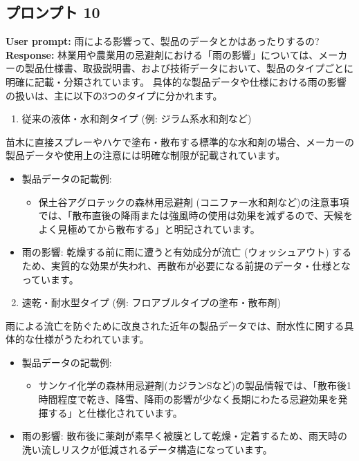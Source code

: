 \documentclass[a4paper, 11pt]{jsarticle}
\begin{document}
\subsection{プロンプト 10}
\noindent\textbf{User prompt:} 雨による影響って、製品のデータとかはあったりするの? \\
\noindent\textbf{Response:} 林業用や農業用の忌避剤における「雨の影響」については、メーカーの製品仕様書、取扱説明書、および技術データにおいて、製品のタイプごとに明確に記載・分類されています。
具体的な製品データや仕様における雨の影響の扱いは、主に以下の3つのタイプに分かれます。
\begin{enumerate}
    \item 従来の液体・水和剤タイプ (例: ジラム系水和剤など)
\end{enumerate}
苗木に直接スプレーやハケで塗布・散布する標準的な水和剤の場合、メーカーの製品データや使用上の注意には明確な制限が記載されています。
\begin{itemize}
    \item 製品データの記載例:
    \begin{itemize}
        \item[○] 保土谷アグロテックの森林用忌避剤 (コニファー水和剤など)の注意事項では、「散布直後の降雨または強風時の使用は効果を減ずるので、天候をよく見極めてから散布する」と明記されています\cite{ref15}。
    \end{itemize}
    \item 雨の影響: 乾燥する前に雨に遭うと有効成分が流亡 (ウォッシュアウト) するため、実質的な効果が失われ、再散布が必要になる前提のデータ・仕様となっています。
\end{itemize}
\begin{enumerate}
    \setcounter{enumi}{1}
    \item 速乾・耐水型タイプ (例: フロアブルタイプの塗布・散布剤)
\end{enumerate}
雨による流亡を防ぐために改良された近年の製品データでは、耐水性に関する具体的な仕様がうたわれています。
\begin{itemize}
    \item 製品データの記載例:
    \begin{itemize}
        \item[○] サンケイ化学の森林用忌避剤(カジランSなど)の製品情報では、「散布後1時間程度で乾き、降雪、降雨の影響が少なく長期にわたる忌避効果を発揮する」と仕様化されています\cite{ref20}。
    \end{itemize}
    \item 雨の影響: 散布後に薬剤が素早く被膜として乾燥・定着するため、雨天時の洗い流しリスクが低減されるデータ構造になっています。
\end{itemize}
\end{document}
